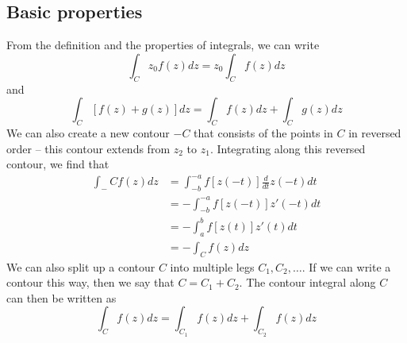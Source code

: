 \documentclass{article}
\begin{document}
\subsection{Basic properties}
From the definition and the properties of integrals, we can write
\[
	\int_C z_0 f(z) dz = z_0 \int_C f(z) dz
\]
and
\[
	\int_C [f(z) + g(z)] dz = \int_C f(z) dz + \int_C g(z) dz
\]
We can also create a new contour $-C$ that consists of the points in $C$ in reversed order -- this contour extends from $z_2$ to $z_1$. Integrating along this reversed contour, we find that
\begin{align*}
	\int_-C f(z) dz 
	&= \int_{-b}^{-a} f[z(-t)] \frac{d}{dt} z(-t) dt \\
	&= -\int_{-b}^{-a} f[z(-t)] z'(-t) dt \\
	&= -\int_a^b f[z(t)] z'(t) dt \\
	&= -\int_C f(z) dz
\end{align*}
We can also split up a contour $C$ into multiple legs $C_1, C_2, \dots$. If we can write a contour this way, then we say that $C = C_1 + C_2$. The contour integral along $C$ can then be written as
\[
	\int_C f(z) dz = \int_{C_1} f(z) dz + \int_{C_2} f(z) dz
\]
\end{document}
